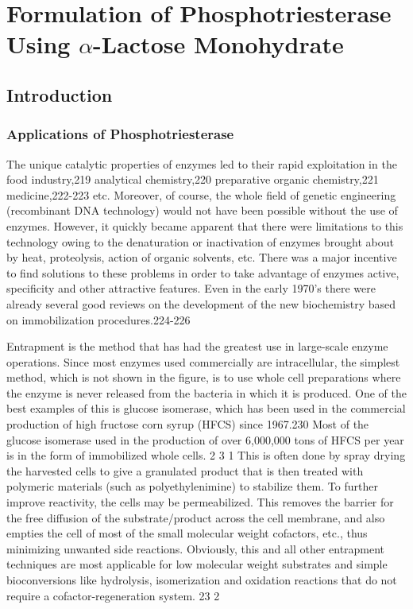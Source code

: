 \chapter{Formulation of Phosphotriesterase Using $\alpha$-Lactose Monohydrate} 
\label{chap:lactose}

\begin{refsection}

\section{Introduction}

\subsection{Applications of Phosphotriesterase}

The unique catalytic properties of enzymes led to their rapid exploitation in
the food industry,219 analytical chemistry,220 preparative organic chemistry,221
medicine,222-223 etc. Moreover, of course, the whole field of genetic
engineering (recombinant DNA technology) would not have been possible without
the use of enzymes. However, it quickly became apparent that there were
limitations to this technology owing to the denaturation or inactivation of
enzymes brought about by heat, proteolysis, action of organic solvents, etc.
There was a major incentive to find solutions to these problems in order to
take advantage of enzymes active, specificity and other attractive features.
Even in the early 1970's there were already several good reviews on the
development of the new biochemistry based on immobilization procedures.224-226

Entrapment is the method that has had the greatest use in large-scale enzyme
operations. Since most enzymes used commercially are intracellular, the
simplest method, which is not shown in the figure, is to use whole cell
preparations where the enzyme is never released from the bacteria in which it
is produced. One of the best examples of this is glucose isomerase, which has
been used in the commercial production of high fructose corn syrup (HFCS) since
1967.230 Most of the glucose isomerase used in the production of over 6,000,000
tons of HFCS per year is in the form of immobilized whole cells. 2 3 1 This is
often done by spray drying the harvested cells to give a granulated product
that is then treated with polymeric materials (such as polyethylenimine) to
stabilize them. To further improve reactivity, the cells may be permeabilized.
This removes the barrier for the free diffusion of the substrate/product across
the cell membrane, and also empties the cell of most of the small molecular
weight cofactors, etc., thus minimizing unwanted side reactions. Obviously,
this and all other entrapment techniques are most applicable for low molecular
weight substrates and simple bioconversions like hydrolysis, isomerization and
oxidation reactions that do not require a cofactor-regeneration system. 23 2


\end{refsection}
